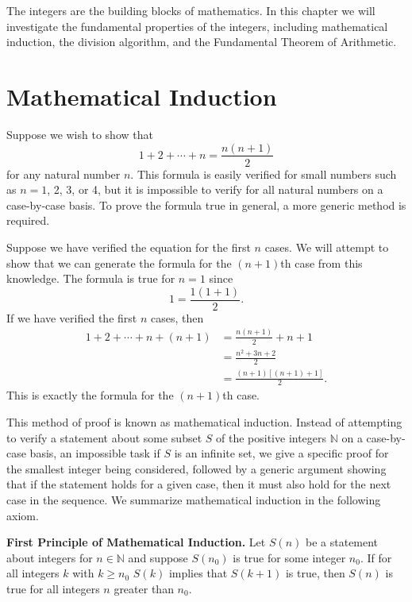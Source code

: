 

 
 
The integers are the building blocks of mathematics. In this chapter we will investigate  the fundamental properties of the integers, including mathematical induction, the division algorithm, and the Fundamental Theorem of Arithmetic.


\section{Mathematical Induction}\label{integers:math_induction}

Suppose we wish to show that
\[
1 + 2 + \cdots + n = \frac{n(n + 1)}{2}
\]
for any natural number $n$. This formula is easily  verified for small numbers such as $n = 1$, 2, 3, or 4, but it is impossible to verify for all natural numbers on a case-by-case basis.  To prove the formula true in general, a more generic method is required.

Suppose we have verified the equation for the first $n$ cases.  We will attempt to show that we can generate the formula for the $(n + 1)$th case from this knowledge.  The formula is true for $n = 1$ since 
\[
1 = \frac{1(1 + 1)}{2}.
\]
If we have verified the first $n$ cases, then
\begin{align*}
1 + 2 + \cdots + n + (n + 1) & = \frac{n(n + 1)}{2} + n + 1 \\
& = \frac{n^2 + 3n + 2}{2} \\
& = \frac{(n + 1)[(n + 1) + 1]}{2}.
\end{align*}
This is exactly the formula for the $(n + 1)$th case.
 
This method of proof is known as {\bfi mathematical induction}.  Instead of attempting to verify a statement about some subset $S$ of the positive integers ${\mathbb N}$ on a case-by-case basis, an impossible task if $S$ is an infinite set, we give a specific proof for the smallest integer being considered, followed by a generic argument showing that if the statement holds for a given case, then it must also hold for the next  case in the sequence.  We summarize mathematical induction in the following axiom. 

\medskip

\noindent
{\bf First Principle of Mathematical Induction.} 
Let $S(n)$ be a statement about integers for  $n \in {\mathbb N}$ and suppose $S(n_0)$ is true for some integer $n_0$.  If for all integers $k$ with $k \geq n_0$ $S(k)$ implies that $S(k+1)$ is true, then $S(n)$ is true for all integers $n$ greater than $n_0$.  

